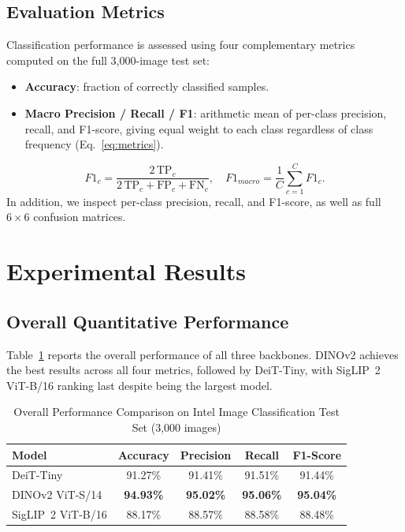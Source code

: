 \documentclass[journal]{IEEEtran}
\begin{document}
\subsection{Evaluation Metrics}
Classification performance is assessed using four complementary metrics computed
on the full 3,000-image test set:
\begin{itemize}
    \item \textbf{Accuracy}: fraction of correctly classified samples.
    \item \textbf{Macro Precision / Recall / F1}: arithmetic mean of
    per-class precision, recall, and F1-score, giving equal weight to each class
    regardless of class frequency (Eq.~\eqref{eq:metrics}).
\end{itemize}
\begin{equation}
    F1_c = \frac{2\,\text{TP}_c}{2\,\text{TP}_c + \text{FP}_c + \text{FN}_c},
    \quad F1_{macro} = \frac{1}{C}\sum_{c=1}^{C} F1_c.
    \label{eq:metrics}
\end{equation}
In addition, we inspect per-class precision, recall, and F1-score, as well as
full $6\times6$ confusion matrices.

\section{Experimental Results}
\label{sec:results}

\subsection{Overall Quantitative Performance}
Table~\ref{tab:comparison} reports the overall performance of all three backbones.
DINOv2 achieves the best results across all four metrics, followed by DeiT-Tiny,
with SigLIP~2 ViT-B/16 ranking last despite being the largest model.

\begin{table}[!t]
\renewcommand{\arraystretch}{1.3}
\caption{Overall Performance Comparison on Intel Image Classification Test Set (3,000 images)}
\label{tab:comparison}
\centering
\begin{tabular}{lcccc}
\toprule
\textbf{Model} & \textbf{Accuracy} & \textbf{Precision} & \textbf{Recall} & \textbf{F1-Score} \\
\midrule
DeiT-Tiny             & 91.27\% & 91.41\% & 91.51\% & 91.44\% \\
DINOv2 ViT-S/14      & \textbf{94.93\%} & \textbf{95.02\%} & \textbf{95.06\%} & \textbf{95.04\%} \\
SigLIP~2 ViT-B/16    & 88.17\% & 88.57\% & 88.58\% & 88.48\% \\
\bottomrule
\end{tabular}
\end{table}
\end{document}
